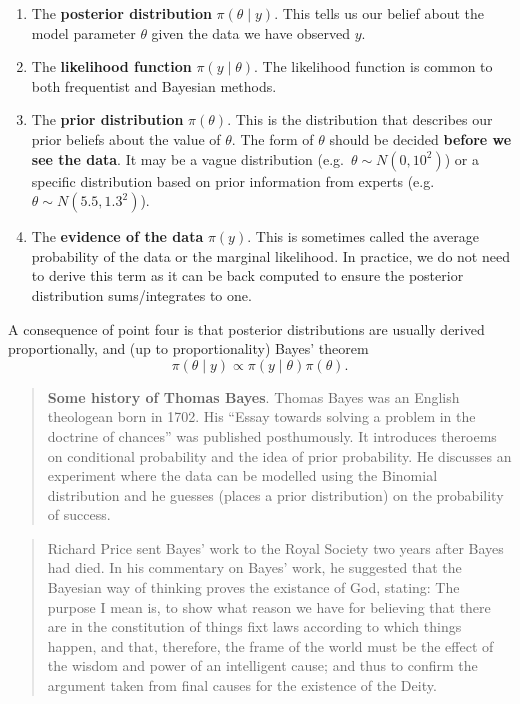 \documentclass[
]{book}
\providecommand{\tightlist}{%
  \setlength{\itemsep}{0pt}\setlength{\parskip}{0pt}}
\theoremstyle{definition}
\theoremstyle{definition}
\theoremstyle{definition}
\theoremstyle{definition}
\theoremstyle{remark}
\begin{document}
\begin{enumerate}
\def\labelenumi{\arabic{enumi}.}
\tightlist
\item
  The \textbf{posterior distribution} \(\pi(\theta \mid y)\). This tells us our belief about the model parameter \(\theta\) given the data we have observed \(y\).
\item
  The \textbf{likelihood function} \(\pi(y \mid \theta)\). The likelihood function is common to both frequentist and Bayesian methods.
\item
  The \textbf{prior distribution} \(\pi(\theta)\). This is the distribution that describes our prior beliefs about the value of \(\theta\). The form of \(\theta\) should be decided \textbf{before we see the data}. It may be a vague distribution (e.g.~\(\theta \sim N(0, 10^2)\)) or a specific distribution based on prior information from experts (e.g.~\(\theta \sim N(5.5, 1.3^2)\)).\\
\item
  The \textbf{evidence of the data} \(\pi(y)\). This is sometimes called the average probability of the data or the marginal likelihood. In practice, we do not need to derive this term as it can be back computed to ensure the posterior distribution sums/integrates to one.
\end{enumerate}

A consequence of point four is that posterior distributions are usually derived proportionally, and (up to proportionality) Bayes' theorem
\[
\pi(\theta \mid y) \propto \pi(y\mid\theta)\pi(\theta).
\]

\begin{quote}
\textbf{Some history of Thomas Bayes}. Thomas Bayes was an English theologean born in 1702. His ``Essay towards solving a problem in the doctrine of chances'' was published posthumously. It introduces theroems on conditional probability and the idea of prior probability. He discusses an experiment where the data can be modelled using the Binomial distribution and he guesses (places a prior distribution) on the probability of success.
\end{quote}

\begin{quote}
Richard Price sent Bayes' work to the Royal Society two years after Bayes had died. In his commentary on Bayes' work, he suggested that the Bayesian way of thinking proves the existance of God, stating: The purpose I mean is, to show what reason we have for believing that there are in the constitution of things fixt laws according to which things happen, and that, therefore, the frame of the world must be the effect of the wisdom and power of an intelligent cause; and thus to confirm the argument taken from final causes for the existence of the Deity.
\end{quote}
\end{document}
